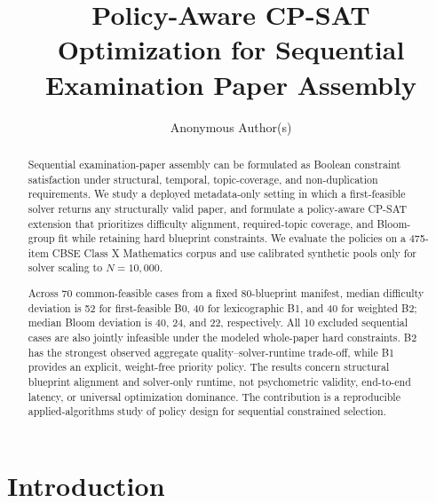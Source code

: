 \documentclass[runningheads]{llncs}
\begin{document}
\title{Policy-Aware CP-SAT Optimization for Sequential Examination Paper Assembly}


\author{Anonymous Author(s)}

\maketitle

\begin{abstract}
Sequential examination-paper assembly can be formulated as Boolean constraint satisfaction under structural, temporal, topic-coverage, and non-duplication requirements. We study a deployed metadata-only setting in which a first-feasible solver returns any structurally valid paper, and formulate a policy-aware CP-SAT extension that prioritizes difficulty alignment, required-topic coverage, and Bloom-group fit while retaining hard blueprint constraints. We evaluate the policies on a 475-item CBSE Class X Mathematics corpus and use calibrated synthetic pools only for solver scaling to $N{=}10{,}000$.

Across 70 common-feasible cases from a fixed 80-blueprint manifest, median difficulty deviation is 52 for first-feasible B0, 40 for lexicographic B1, and 40 for weighted B2; median Bloom deviation is 40, 24, and 22, respectively. All 10 excluded sequential cases are also jointly infeasible under the modeled whole-paper hard constraints. B2 has the strongest observed aggregate quality--solver-runtime trade-off, while B1 provides an explicit, weight-free priority policy. The results concern structural blueprint alignment and solver-only runtime, not psychometric validity, end-to-end latency, or universal optimization dominance. The contribution is a reproducible applied-algorithms study of policy design for sequential constrained selection.
\end{abstract}

\section{Introduction}
\label{sec:intro}
\end{document}
